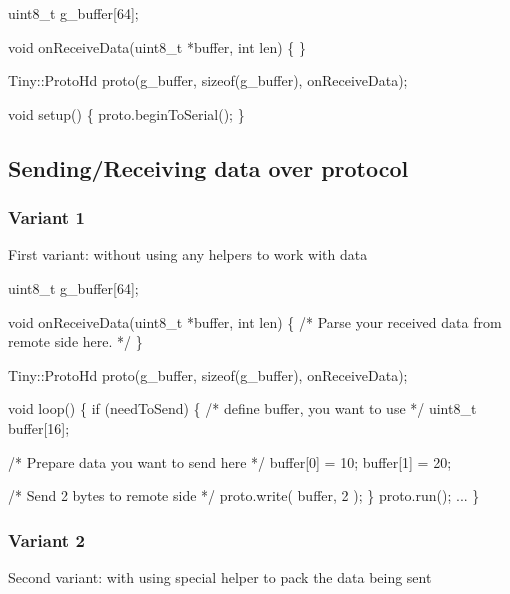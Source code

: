 \begin{DoxyCode}
uint8\_t g\_buffer[64];

\textcolor{keywordtype}{void} onReceiveData(uint8\_t *buffer, \textcolor{keywordtype}{int} len)
\{
\}

Tiny::ProtoHd proto(g\_buffer, \textcolor{keyword}{sizeof}(g\_buffer), onReceiveData);

\textcolor{keywordtype}{void} setup()
\{
    proto.beginToSerial();
\}
\end{DoxyCode}
\hypertarget{arduino_arduino_tiny_hd_send_receive}{}\subsection{Sending/\+Receiving data over protocol}\label{arduino_arduino_tiny_hd_send_receive}
\hypertarget{arduino_arduino_tiny_hd_send_receive1}{}\subsubsection{Variant 1}\label{arduino_arduino_tiny_hd_send_receive1}
First variant\+: without using any helpers to work with data 
\begin{DoxyCode}
uint8\_t g\_buffer[64];

\textcolor{keywordtype}{void} onReceiveData(uint8\_t *buffer, \textcolor{keywordtype}{int} len)
\{
    \textcolor{comment}{/* Parse your received data from remote side here. */}
\}

Tiny::ProtoHd proto(g\_buffer, \textcolor{keyword}{sizeof}(g\_buffer), onReceiveData);

\textcolor{keywordtype}{void} loop()
\{
    \textcolor{keywordflow}{if} (needToSend)
    \{
        \textcolor{comment}{/* define buffer, you want to use */}
        uint8\_t buffer[16];

        \textcolor{comment}{/* Prepare data you want to send here */}
        buffer[0] = 10;
        buffer[1] = 20;

        \textcolor{comment}{/* Send 2 bytes to remote side */}
        proto.write( buffer, 2 );
    \}
    proto.run();
    ...
\}
\end{DoxyCode}
\hypertarget{arduino_arduino_tiny_hd_send_receive2}{}\subsubsection{Variant 2}\label{arduino_arduino_tiny_hd_send_receive2}
Second variant\+: with using special helper to pack the data being sent 
